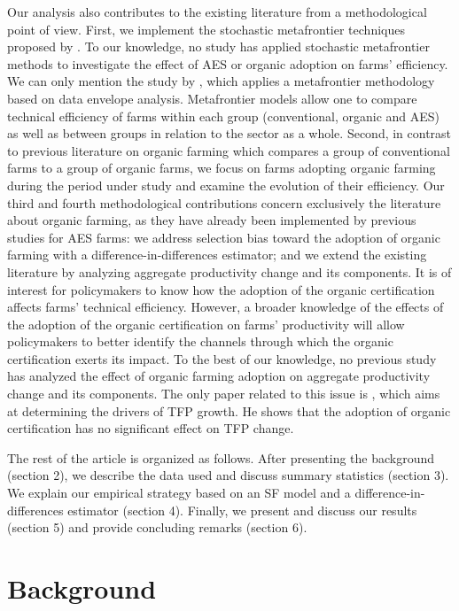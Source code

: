 \begin{Article}
\begin{refsection}[Lassalas]
Our analysis also contributes to the existing literature from a
methodological point of view. First, we implement the stochastic
metafrontier techniques proposed by \textcite{huang_huang_liu_2014}. To
our \mbox{knowledge}, no study has applied stochastic metafrontier methods to
investigate the effect of AES or organic adoption on farms' efficiency.
We can only mention the study by \textcite{beltran2014}, which applies a metafrontier methodology based on data
envelope analysis. Metafrontier models allow one to compare technical
efficiency of farms within each group (conventional, organic and AES) as
well as between groups in relation to the sector as a whole. Second, in
contrast to previous literature on organic farming which compares a
group of conventional farms to a group of organic farms, we focus on
farms adopting organic farming during the period under study and examine
the evolution of their efficiency. Our third and fourth methodological
contributions concern exclusively the  literature about organic farming, as they have
already been implemented by previous studies for AES farms: we address
selection bias toward the adoption of organic farming with a
difference-in-differences estimator; and we extend the existing
literature by analyzing aggregate productivity change and its
components. It is of interest for policymakers to know how the adoption
of the organic certification affects farms' technical efficiency.
However, a broader knowledge of the effects of the adoption of the
organic certification on farms' productivity will allow policymakers to
better identify the channels through which the organic certification
exerts its impact. To the best of our knowledge, no previous study has
analyzed the effect of organic farming adoption on aggregate
productivity change and its components. The only paper related to this
issue is \textcite{balez2015sources}, which aims at determining the drivers of
TFP growth. He shows that the adoption of organic certification has no
significant effect on TFP change.

The rest of the article is organized as follows. After presenting the
background (section 2), we describe the data used and discuss summary
statistics (section 3). We explain our empirical strategy based on an SF
model and a difference-in-differences estimator (section 4). Finally, we
present and discuss our results (section 5) and provide concluding
remarks (section 6).

\section{Background}


\end{refsection}
\end{Article}
